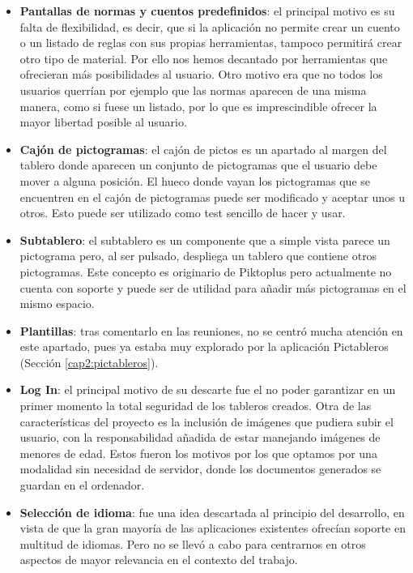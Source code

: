 \begin{itemize}
	\item\textbf{Pantallas de normas y cuentos predefinidos}: el principal motivo es su falta de flexibilidad, es decir, que si la aplicación no permite crear un cuento o un listado de reglas con sus propias herramientas, tampoco permitirá crear otro tipo de material. Por ello nos hemos decantado por herramientas que ofrecieran más posibilidades al usuario. Otro motivo era que no todos los usuarios querrían por ejemplo que las normas aparecen de una misma manera, como si fuese un listado, por lo que es imprescindible ofrecer la mayor libertad posible al usuario.
	
		
	\item \textbf{Cajón de pictogramas}: el cajón de pictos es un apartado al margen del tablero donde aparecen un conjunto de pictogramas que el usuario debe mover a alguna posición. El hueco donde vayan los pictogramas que se encuentren en el cajón de pictogramas puede ser modificado y aceptar unos u otros. Esto puede ser utilizado como test sencillo de hacer y usar.
	
	\item \textbf{Subtablero}: el subtablero es un componente que a simple vista parece un pictograma pero, al ser pulsado, despliega un tablero que contiene otros pictogramas. Este concepto es originario de Piktoplus pero actualmente no cuenta con soporte y puede ser de utilidad para añadir más pictogramas en el mismo espacio.
	
	\item \textbf{Plantillas}: tras comentarlo en las reuniones, no se centró mucha atención en este apartado, pues ya estaba muy explorado por la aplicación Pictableros (Sección \ref{cap2:pictableros}).
	
	\item \textbf{Log In}: el principal motivo de su descarte fue el no poder garantizar en un primer momento la total seguridad de los tableros creados.
	Otra de las características del proyecto es la inclusión de imágenes que pudiera subir el usuario, con la responsabilidad añadida de estar manejando imágenes de menores de edad. Estos fueron los motivos por los que optamos por una modalidad sin necesidad de servidor, donde los documentos generados se guardan en el ordenador.
	
	\item \textbf{Selección de idioma}: fue una idea descartada al principio del desarrollo, en vista de que la gran mayoría de las aplicaciones existentes ofrecían soporte en multitud de idiomas. Pero no se llevó a cabo para centrarnos en otros aspectos de mayor relevancia en el contexto del trabajo.
	
\end{itemize}


